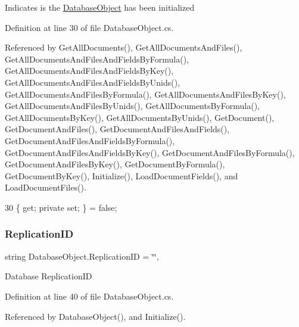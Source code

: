 Indicates is the \mbox{\hyperlink{class_database_object}{Database\+Object}} has been initialized 



Definition at line 30 of file Database\+Object.\+cs.



Referenced by Get\+All\+Documents(), Get\+All\+Documents\+And\+Files(), Get\+All\+Documents\+And\+Files\+And\+Fields\+By\+Formula(), Get\+All\+Documents\+And\+Files\+And\+Fields\+By\+Key(), Get\+All\+Documents\+And\+Files\+And\+Fields\+By\+Unids(), Get\+All\+Documents\+And\+Files\+By\+Formula(), Get\+All\+Documents\+And\+Files\+By\+Key(), Get\+All\+Documents\+And\+Files\+By\+Unids(), Get\+All\+Documents\+By\+Formula(), Get\+All\+Documents\+By\+Key(), Get\+All\+Documents\+By\+Unids(), Get\+Document(), Get\+Document\+And\+Files(), Get\+Document\+And\+Files\+And\+Fields(), Get\+Document\+And\+Files\+And\+Fields\+By\+Formula(), Get\+Document\+And\+Files\+And\+Fields\+By\+Key(), Get\+Document\+And\+Files\+By\+Formula(), Get\+Document\+And\+Files\+By\+Key(), Get\+Document\+By\+Formula(), Get\+Document\+By\+Key(), Initialize(), Load\+Document\+Fields(), and Load\+Document\+Files().


\begin{DoxyCode}
30 \{ \textcolor{keyword}{get}; \textcolor{keyword}{private} \textcolor{keyword}{set}; \} = \textcolor{keyword}{false};
\end{DoxyCode}
\mbox{\label{class_database_object_aaa091ee1a9a86d2d10fe2381ee2d1f4c}} 
\subsubsection{\texorpdfstring{Replication\+ID}{ReplicationID}}
{\footnotesize\ttfamily string Database\+Object.\+Replication\+ID = \char`\"{}\char`\"{}\hspace{0.3cm}{\ttfamily [get]}, {\ttfamily [set]}}



Database Replication\+ID 



Definition at line 40 of file Database\+Object.\+cs.



Referenced by Database\+Object(), and Initialize().


